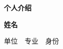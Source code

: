 %
%
%

\vfill

\begin{center}
  {\SlideCoverFont\bfseries\color{SlideAccent}个人介绍}\par
  \vspace{0.75cm}
  {\SlideTitleFont\bfseries 姓名}\par
  \vspace{0.20cm}
  {\SlideTextFont 单位　专业　身份}\par
\end{center}

\vfill
